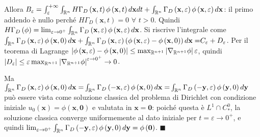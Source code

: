 \documentclass{article}
\begin{document}
Allora $B_{\varepsilon }=\int_{\varepsilon }^{+\infty }\int_{%
\mathbb{R}
^{n}}H\Gamma _{D}\left( \mathbf{x},t\right) \phi \left( \mathbf{x},t\right) d%
\mathbf{x}dt+\int_{%
\mathbb{R}
^{n}}\Gamma _{D}\left( \mathbf{x},\varepsilon \right) \phi \left( \mathbf{x}%
,\varepsilon \right) d\mathbf{x}$: il primo addendo \`{e} nullo perch\'{e} $%
H\Gamma _{D}\left( \mathbf{x},t\right) =0$ $\forall $ $t>0$. Quindi $H\Gamma
_{D}\left( \phi \right) =\lim_{\varepsilon \rightarrow 0^{+}}\int_{%
\mathbb{R}
^{n}}\Gamma _{D}\left( \mathbf{x},\varepsilon \right) \phi \left( \mathbf{x}%
,\varepsilon \right) d\mathbf{x}$. Si riscrive l'integrale come $\int_{%
\mathbb{R}
^{n}}\Gamma _{D}\left( \mathbf{x},\varepsilon \right) \phi \left( \mathbf{x}%
,0\right) d\mathbf{x}+\int_{%
\mathbb{R}
^{n}}\Gamma _{D}\left( \mathbf{x},\varepsilon \right) \left( \phi \left( 
\mathbf{x},\varepsilon \right) -\phi \left( \mathbf{x},0\right) \right) d%
\mathbf{x=}C_{\varepsilon }+D_{\varepsilon }$. Per il teorema di Lagrange $%
\left\vert \phi \left( \mathbf{x},\varepsilon \right) -\phi \left( \mathbf{x}%
,0\right) \right\vert \leq \max_{%
\mathbb{R}
^{n+1}}\left\vert \nabla _{%
\mathbb{R}
^{n+1}}\phi \right\vert \varepsilon $, quindi $\left\vert D_{\varepsilon
}\right\vert \leq \varepsilon \max_{%
\mathbb{R}
^{n+1}}\left\vert \nabla _{%
\mathbb{R}
^{n+1}}\phi \right\vert ^{\varepsilon \rightarrow 0^{+}}\rightarrow 0$.

Ma $\int_{%
\mathbb{R}
^{n}}\Gamma _{D}\left( \mathbf{x},\varepsilon \right) \phi \left( \mathbf{x}%
,0\right) d\mathbf{x=}\int_{%
\mathbb{R}
^{n}}\Gamma _{D}\left( -\mathbf{x},\varepsilon \right) \phi \left( \mathbf{x}%
,0\right) d\mathbf{x=}\int_{%
\mathbb{R}
^{n}}\Gamma _{D}\left( \mathbf{-y},\varepsilon \right) \phi \left( \mathbf{y}%
,0\right) d\mathbf{y}$ pu\`{o} essere vista come soluzione classica del
problema di Dirichlet con condizione iniziale $u_{0}\left( \mathbf{x}\right)
=\phi \left( \mathbf{x,0}\right) $ e valutata in $\mathbf{x=0}$: poich\'{e}
questa \`{e} $L^{1}\cap C_{\ast }^{0}$, la soluzione classica converge
uniformemente al dato iniziale per $t=\varepsilon \rightarrow 0^{+}$, e
quindi $\lim_{\varepsilon \rightarrow 0^{+}}\int_{%
\mathbb{R}
^{n}}\Gamma _{D}\left( \mathbf{-y},\varepsilon \right) \phi \left( \mathbf{y}%
,0\right) d\mathbf{y}=\phi \left( \mathbf{0}\right) $. $\blacksquare $
\end{document}
